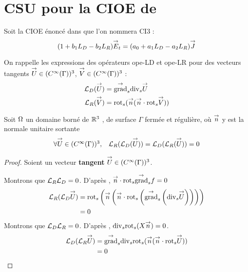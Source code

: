 \section{CSU pour la CIOE de \cite{aubakirov_electromagnetic_2014}}

  Soit la CIOE énoncé dans \cite{soudais_3d_2017} que l'on nommera CI3 :
  \begin{equation}
    \label{eq:unicite:ci3:ci3}
    ( 1 + b_1 L_D - b_2 L_R)\vE_t = (a_0 + a_1 L_D - a_2 L_R ) \vJ
  \end{equation}

  On rappelle les expressions des opérateurs \gls{ope-LD} et \gls{ope-LR} pour des vecteurs tangents \(\vect U \in (C^\infty(\Gamma))^3\), \( \vect V \in (C^\infty(\Gamma))^3\) :
  \begin{align*}
    \LD(\vect U) &= \tgrads \tdivs \vect U\\
    \LR(\vect V) &= \trots( \vn ( \vn \cdot \trots \vect V))\\
  \end{align*}
  \begin{prop}
    Soit \(\OO\) un domaine borné de \(\RR^3\) , de surface \(\Gamma\) fermée et régulière, où \(\vect n\) y est la normale unitaire
    sortante
    \begin{equation}
      \begin{matrix}
        \forall \vect U \in (C^\infty(\Gamma))^3 ,& \LR(\LD(\vect U)) = \LD(\LR(\vect U)) = 0
      \end{matrix}
    \end{equation}
  \end{prop}
  \begin{proof}

    Soient un vecteur \textbf{tangent} \(\vect U \in (C^\infty(\Gamma))^3\).

    Montrons que \(\LR\LD = 0\). D’après \cite[p.~1029, A3.42]{bladel_electromagnetic_2007}, \(\vn \cdot \trots\tgrads f = 0\)
    \begin{align*}
      \LR(\LD \vect U)  &= \trots \left(\vn \left(\vn \cdot \trots \left( \tgrads \left(\tdivs \vect U\right)\right)\right)\right) \\
      &= 0
    \end{align*}
    Montrons que \(\LD\LR = 0\). D’après \cite[p.~1029, A3.43]{bladel_electromagnetic_2007}, \(\tdivs \trots (X\vn) = 0\).
    \begin{align*}
      \LD(\LR \vect U) &= \tgrads \tdivs \trots (\vn (\vn \cdot \trots \vect U)) \\
      &= 0
    \end{align*}
  \end{proof}

